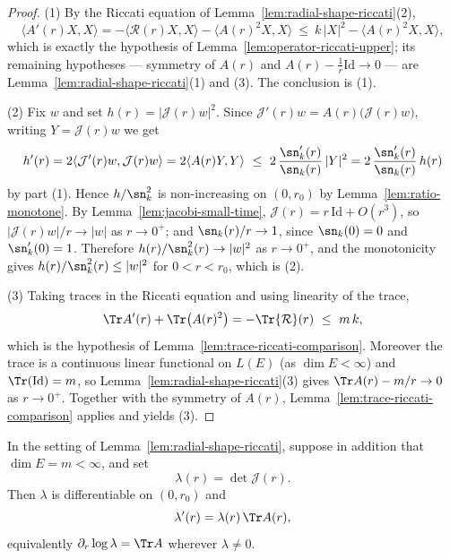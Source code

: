 \begin{proof}
\leanok
(1) By the Riccati equation of
Lemma~\ref{lem:radial-shape-riccati}(2),
$$\langle A'(r)X,X\rangle=-\langle{\mathcal R}(r)X,X\rangle
-\langle A(r)^2X,X\rangle\ \le\ k\,|X|^2-\langle A(r)^2X,X\rangle,$$
which is exactly the hypothesis of
Lemma~\ref{lem:operator-riccati-upper}; its remaining hypotheses —
symmetry of $A(r)$ and $A(r)-\tfrac1r\mathrm{Id}\to0$ — are
Lemma~\ref{lem:radial-shape-riccati}(1) and (3). The conclusion is (1).

(2) Fix $w$ and set $h(r)=|{\mathcal J}(r)w|^2$. Since
${\mathcal J}'(r)w=A(r)\bigl({\mathcal J}(r)w\bigr)$, writing
$Y={\mathcal J}(r)w$ we get
$$h'(r)=2\langle{\mathcal J}'(r)w,{\mathcal J}(r)w\rangle
=2\langle A(r)Y,Y\rangle\ \le\ 2\,\frac{\sn_k'(r)}{\sn_k(r)}\,|Y|^2
=2\,\frac{\sn_k'(r)}{\sn_k(r)}\,h(r)$$
by part (1). Hence $h/\sn_k^2$ is non-increasing on $(0,r_0)$ by
Lemma~\ref{lem:ratio-monotone}. By Lemma~\ref{lem:jacobi-small-time},
${\mathcal J}(r)=r\,\mathrm{Id}+O(r^3)$, so $|{\mathcal J}(r)w|/r\to|w|$
as $r\to0^+$; and $\sn_k(r)/r\to1$, since $\sn_k(0)=0$ and
$\sn_k'(0)=1$. Therefore $h(r)/\sn_k^2(r)\to|w|^2$ as $r\to0^+$, and
the monotonicity gives $h(r)/\sn_k^2(r)\le|w|^2$ for $0<r<r_0$, which
is (2).

(3) Taking traces in the Riccati equation and using linearity of the
trace,
$$\Tr A'(r)+\Tr\bigl(A(r)^2\bigr)=-\Tr{\mathcal R}(r)\ \le\ m\,k,$$
which is the hypothesis of
Lemma~\ref{lem:trace-riccati-comparison}. Moreover the trace is a
continuous linear functional on $L(E)$ (as $\dim E<\infty$) and
$\Tr(\mathrm{Id})=m$, so Lemma~\ref{lem:radial-shape-riccati}(3) gives
$\Tr A(r)-m/r\to0$ as $r\to0^+$. Together with the symmetry of $A(r)$,
Lemma~\ref{lem:trace-riccati-comparison} applies and yields (3).
\end{proof}

\begin{lemma}
\label{lem:radial-volume-element}
\leanok
In the setting of Lemma~\ref{lem:radial-shape-riccati}, suppose in addition
that $\dim E=m<\infty$, and set
$$\lambda(r)=\det{\mathcal J}(r).$$
Then $\lambda$ is differentiable on $(0,r_0)$ and
$$\lambda'(r)=\lambda(r)\,\Tr A(r),$$
equivalently $\partial_r\log\lambda=\Tr A$ wherever $\lambda\ne0$.
\end{lemma}

